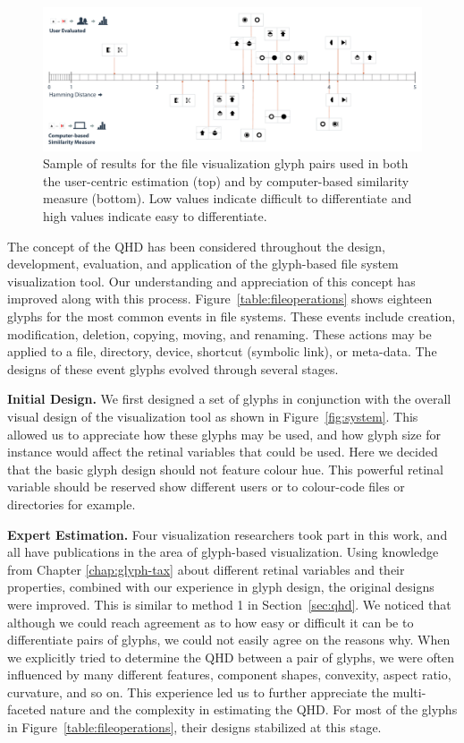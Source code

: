 \begin{figure}[t!]
\begin{center}
\includegraphics[width=\textwidth]{images/filesystem/Comparison_ourglyphs}
\end{center}
\caption{Sample of results for the file visualization glyph pairs used in both the user-centric estimation (top) and by computer-based similarity measure (bottom). Low values indicate difficult to differentiate and high values indicate easy to differentiate.}
\label{fig:our_glyph_scores}
\end{figure}

The concept of the QHD has been considered throughout the design, development, evaluation, and application of the glyph-based file system visualization tool.
Our understanding and appreciation of this concept has improved along with this process.
Figure~\ref{table:fileoperations} shows eighteen glyphs for the most common events in file systems.
These events include creation, modification, deletion, copying, moving, and renaming.
These actions may be applied to a file, directory, device, shortcut (symbolic link), or meta-data.
The designs of these event glyphs evolved through several stages.

\textbf{Initial Design.} We first designed a set of glyphs in conjunction with the overall visual design of the visualization tool as shown in Figure~\ref{fig:system}.
This allowed us to appreciate how these glyphs may be used, and how glyph size for instance would affect the retinal variables that could be used.
Here we decided that the basic glyph design should not feature colour hue. 
This powerful retinal variable should be reserved show different users or to colour-code files or directories for example.

\textbf{Expert Estimation.} Four visualization researchers took part in this work, and all have publications in the area of glyph-based visualization.
Using knowledge from Chapter \ref{chap:glyph-tax} about different retinal variables and their properties, combined with our experience in glyph design, the original designs were improved.
This is similar to method 1 in Section~\ref{sec:qhd}.
We noticed that although we could reach agreement as to how easy or difficult it can be to differentiate pairs of glyphs, we could not easily agree on the reasons why.
When we explicitly tried to determine the QHD between a pair of glyphs, we were often influenced by many different features, component shapes, convexity, aspect ratio, curvature, and so on.
This experience led us to further appreciate the multi-faceted nature and the complexity in estimating the QHD.
For most of the glyphs in Figure~\ref{table:fileoperations}, their designs stabilized at this stage. 

